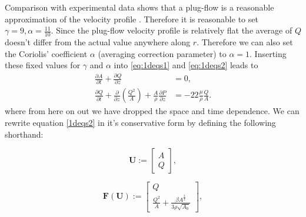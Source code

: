 \documentclass[a4paper, oneside]{discothesis}
\begin{document}
Comparison with experimental data shows that a plug-flow is a reasonable approximation of the velocity profile \cite{hunter1972numerical} \cite{smith2000generation} \cite{smith2002anatomically}.
Therefore it is reasonable to set $\gamma = 9, \alpha = \frac{11}{10}$.
Since the plug-flow velocity profile is relatively flat the average of $Q$ doesn't differ from the actual value anywhere along $r$.
Therefore we can also set the Coriolis' coefficient $\alpha$ (averaging correction parameter) to $\alpha = 1$. \cite{formaggia2010cardiovascular}
Inserting these fixed values for $\gamma$ and $\alpha$ into \autoref{eq:1deqs1} and \autoref{eq:1deqs2} leads to 
\begin{equation}
	\begin{aligned} 
		\frac{\partial A}{\partial t} + \frac{\partial Q}{\partial z} &= 0, \\ 
		\frac{\partial Q}{\partial t} + \frac{\partial}{\partial z}\left(\frac{Q^2}{A} \right) + \frac{A}{\rho} \frac{\partial P}{\partial z} &= -22 \frac{\mu}{\rho} \frac{Q}{A}.
	\end{aligned} \label{1deqs2}
\end{equation}
where from here on out we have dropped the space and time dependence.
We can rewrite equation \ref{1deqs2} in it's conservative form by defining the following shorthand:

\begin{equation}
	\mathbf{U} := 
	\begin{bmatrix}
		A \\
		Q
	\end{bmatrix},
\end{equation}

\begin{equation}
	\mathbf{F} \left( \mathbf{U} \right) := 
	\begin{bmatrix}
		Q \\
		\frac{Q^2}{A} + \frac{\beta A^{\frac{3}{2}}}{3\rho\sqrt{A_0}}
	\end{bmatrix},
\end{equation}
\end{document}
